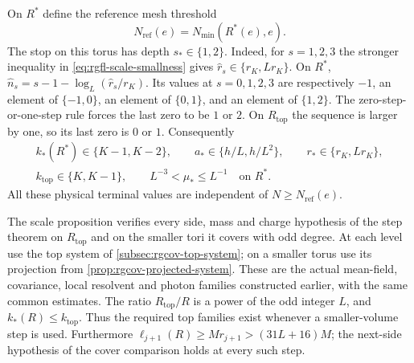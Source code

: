 On $R^*$ define the reference mesh threshold
\begin{equation}\label{eq:rgfl-reference-threshold}
                    N_{\mathrm{ref}}(e)=N_{\min}(R^*(e),e).
\end{equation}
The stop on this torus has depth $s_*\in\{1,2\}$.
Indeed, for $s=1,2,3$ the stronger inequality in
\eqref{eq:rgfl-scale-smallness} gives
$\widehat r_s\in\{r_K,Lr_K\}$.
On $R^*$,
$\widehat n_s=s-1-\log_L(\widehat r_s/r_K)$.
Its values at $s=0,1,2,3$ are respectively
$-1$, an element of $\{-1,0\}$, an element of
$\{0,1\}$, and an element of $\{1,2\}$.
The zero-step-or-one-step rule forces the last zero
to be $1$ or $2$. On $R_{\mathrm{top}}$ the sequence
is larger by one, so its last zero is $0$ or $1$.
Consequently
\begin{equation}\label{eq:rgfl-reference-stop}
 \begin{gathered}
 k_*(R^*)\in\{K-1,K-2\},\qquad
 a_*\in\{h/L,h/L^2\},\qquad r_*\in\{r_K,Lr_K\},\\
 k_{\mathrm{top}}\in\{K,K-1\},\qquad
 L^{-3}<\mu_*\le L^{-1}\quad\text{on }R^* .
 \end{gathered}
\end{equation}
All these physical terminal values are independent
of $N\ge N_{\mathrm{ref}}(e)$.

The scale proposition verifies every side, mass
and charge hypothesis of the step theorem
on $R_{\mathrm{top}}$ and on the smaller tori it covers with odd degree.
At each level use the top system of
\cref{subsec:rgcov-top-system}; on a smaller
torus use its projection from
\cref{prop:rgcov-projected-system}.
These are the actual mean-field, covariance,
local resolvent and photon families constructed
earlier, with the same common estimates.
The ratio $R_{\mathrm{top}}/R$ is a power of the
odd integer $L$, and $k_*(R)\le k_{\mathrm{top}}$.
Thus the required top families exist whenever
a smaller-volume step is used.
Furthermore
$\ell_{j+1}(R)\ge Mr_{j+1}>(31L+16)M$;
the next-side hypothesis of the cover comparison
holds at every such step.

